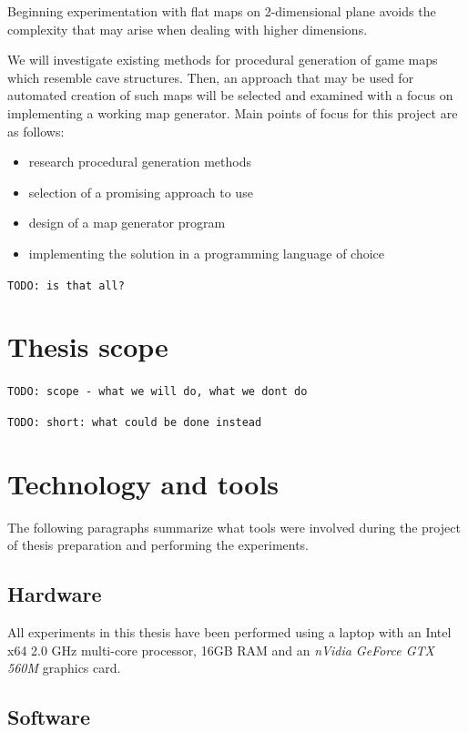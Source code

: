 \documentclass[12pt]{report}
\newcommand{\todo}[1]{}
\renewcommand{\todo}[1]{{\color{red} \par \noindent \footnotesize \texttt{TODO: {#1} }}}
\begin{document}
Beginning experimentation with flat maps on 2-dimensional plane avoids the complexity that may arise when dealing with higher dimensions.

We will investigate existing methods for procedural generation of game maps which resemble cave structures. Then, an approach that may be used for automated creation of such maps will be selected and examined with a focus on implementing a working map generator. Main points of focus for this project are as follows:

\begin{itemize}
	\item research procedural generation methods
	\item selection of a promising approach to use
	\item design of a map generator program
	\item implementing the solution in a programming language of choice
\end{itemize}

\todo{is that all?}

\section{Thesis scope}

\todo{scope - what we will do, what we dont do}

\todo{short: what could be done instead}




\section{Technology and tools}

The following paragraphs summarize what tools were involved during the project of thesis preparation and performing the experiments.

\subsection{Hardware} 

All experiments in this thesis have been performed using a laptop with an Intel x64 2.0 \si{GHz} multi-core processor, 16GB RAM and an \textit{nVidia GeForce GTX 560M} graphics card.
 
\subsection{Software} 
\end{document}
